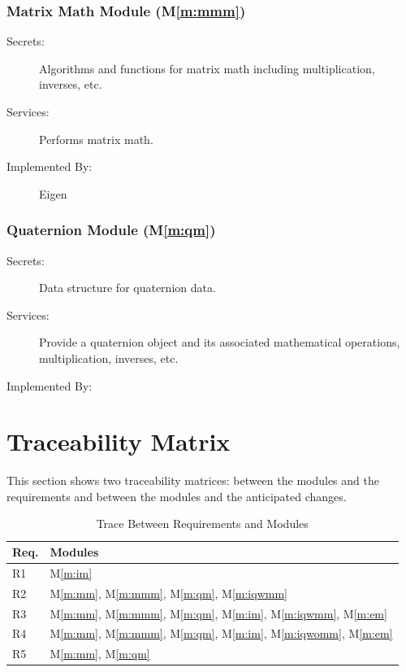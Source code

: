 \documentclass[12pt, titlepage]{article}
\newcommand{\mref}[1]{M\ref{#1}}
\begin{document}
\subsubsection{Matrix Math Module (\mref{m:mmm})}
\begin{description}
  \item[Secrets:] Algorithms and functions for matrix math including multiplication, inverses, etc.
  \item[Services:] Performs matrix math.
  \item[Implemented By:] Eigen \citep{eigenweb}
\end{description}

\subsubsection{Quaternion Module (\mref{m:qm})}
\begin{description}
  \item[Secrets:] Data structure for quaternion data.
  \item[Services:] Provide a quaternion object and its associated mathematical operations, multiplication, inverses, etc.
  \item[Implemented By:] \progname
\end{description}

\section{Traceability Matrix} \label{SecTM}

This section shows two traceability matrices: between the modules and the requirements and between
the modules and the anticipated changes.

\begin{table}[H]
\centering
\begin{tabular}{p{} p{}}
\toprule
\textbf{Req.} & \textbf{Modules}\\
\midrule
R1 & \mref{m:im} \\
R2 & \mref{m:mm}, \mref{m:mmm}, \mref{m:qm}, \mref{m:iqwmm}\\
R3 & \mref{m:mm}, \mref{m:mmm}, \mref{m:qm}, \mref{m:im}, \mref{m:iqwmm}, \mref{m:em}\\
R4 & \mref{m:mm}, \mref{m:mmm}, \mref{m:qm}, \mref{m:im}, \mref{m:iqwomm}, \mref{m:em} \\
R5 & \mref{m:mm}, \mref{m:qm}\\
\bottomrule
\end{tabular}
\caption{Trace Between Requirements and Modules}
\label{TblRT}
\end{table}
\end{document}
